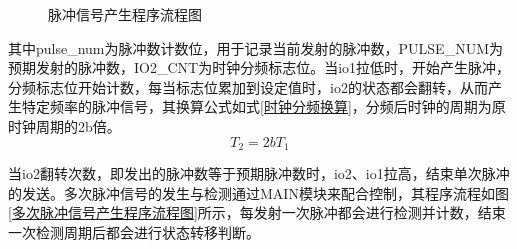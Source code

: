 \begin{figure}[ht]
	\centering
	\caption{脉冲信号产生程序流程图}
	\label{脉冲信号产生程序流程图}
\end{figure}

其中pulse\_num为脉冲数计数位，用于记录当前发射的脉冲数，PULSE\_NUM为预期发射的脉冲数，IO2\_CNT为时钟分频标志位。当io1拉低时，开始产生脉冲，分频标志位开始计数，每当标志位累加到设定值时，io2的状态都会翻转，从而产生特定频率的脉冲信号，其换算公式如式\ref{时钟分频换算}，分频后时钟的周期为原时钟周期的2b倍。
\begin{equation}
	T_2=2bT_1
	\label{时钟分频换算}
\end{equation}\par
当io2翻转次数，即发出的脉冲数等于预期脉冲数时，io2、io1拉高，结束单次脉冲的发送。多次脉冲信号的发生与检测通过MAIN模块来配合控制，其程序流程如图\ref{多次脉冲信号产生程序流程图}所示，每发射一次脉冲都会进行检测并计数，结束一次检测周期后都会进行状态转移判断。


